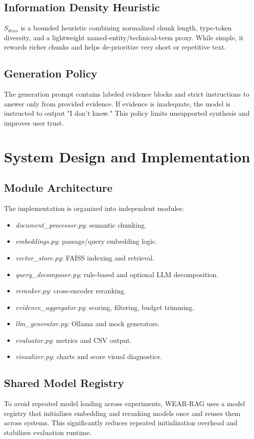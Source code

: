 \documentclass[10pt,draftclsnofoot,onecolumn,journal]{IEEEtran}
\begin{document}
\subsection{Information Density Heuristic}
$S_{dens}$ is a bounded heuristic combining normalized chunk length, type-token diversity, and a lightweight named-entity/technical-term proxy. While simple, it rewards richer chunks and helps de-prioritize very short or repetitive text.

\subsection{Generation Policy}
The generation prompt contains labeled evidence blocks and strict instructions to answer only from provided evidence. If evidence is inadequate, the model is instructed to output "I don't know." This policy limits unsupported synthesis and improves user trust.

\section{System Design and Implementation}
\subsection{Module Architecture}
The implementation is organized into independent modules:
\begin{itemize}
\item \textit{document\_processor.py}: semantic chunking.
\item \textit{embeddings.py}: passage/query embedding logic.
\item \textit{vector\_store.py}: FAISS indexing and retrieval.
\item \textit{query\_decomposer.py}: rule-based and optional LLM decomposition.
\item \textit{reranker.py}: cross-encoder reranking.
\item \textit{evidence\_aggregator.py}: scoring, filtering, budget trimming.
\item \textit{llm\_generator.py}: Ollama and mock generators.
\item \textit{evaluator.py}: metrics and CSV output.
\item \textit{visualizer.py}: charts and score visual diagnostics.
\end{itemize}

\subsection{Shared Model Registry}
To avoid repeated model loading across experiments, WEAR-RAG uses a model registry that initializes embedding and reranking models once and reuses them across systems. This significantly reduces repeated initialization overhead and stabilizes evaluation runtime.
\end{document}
